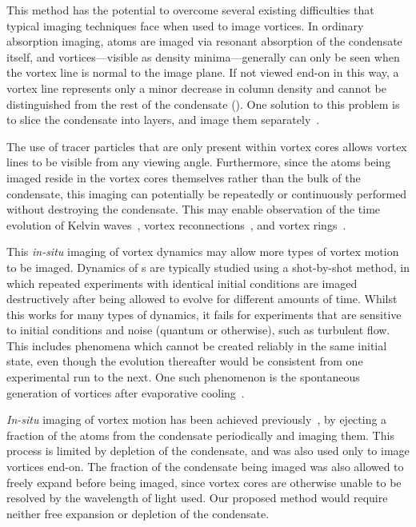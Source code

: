 This method has the potential to overcome several existing difficulties that typical imaging techniques face when used to image vortices. In ordinary absorption imaging, atoms are imaged via resonant absorption of the condensate itself, and vortices---visible as density minima---generally can only be seen when the vortex line is normal to the image plane. If not viewed end-on in this way, a vortex line represents only a minor decrease in column density and cannot be distinguished from the rest of the condensate (). One solution to this problem is to slice the condensate into layers, and image them separately~\cite{anderson_watching_2001}.

The use of tracer particles that are only present within vortex cores allows vortex lines to be visible from any viewing angle.  Furthermore, since the atoms being imaged reside in the vortex cores themselves rather than the bulk of the condensate, this imaging can potentially be repeatedly or continuously performed without destroying the condensate. This may enable observation of the time evolution of Kelvin waves~\cite{bretin_quadrupole_2003}, vortex reconnections~\cite{leadbeater_sound_2001}, and vortex rings~\cite{anderson_watching_2001}.

This \emph{in-situ} imaging of vortex dynamics may allow more types of vortex motion to be imaged. Dynamics of \bec s are typically studied using a shot-by-shot method, in which repeated experiments with identical initial conditions are imaged destructively after being allowed to evolve for different amounts of time. Whilst this works for many types of dynamics, it fails for experiments that are sensitive to initial conditions and noise (quantum or otherwise), such as turbulent flow. This includes phenomena which cannot be created reliably in the same initial state, even though the evolution thereafter would be consistent from one experimental run to the next. One such phenomenon is the spontaneous generation of vortices after evaporative cooling~\cite{weiler_spontaneous_2008}.

\emph{In-situ} imaging of vortex motion has been achieved previously~\cite{freilich_real-time_2010}, by ejecting a fraction of the atoms from the condensate periodically and imaging them. This process is limited by depletion of the condensate, and was also used only to image vortices end-on. The fraction of the condensate being imaged was also allowed to freely expand before being imaged, since vortex cores are otherwise unable to be resolved by the wavelength of light used. Our proposed method would require neither free expansion or depletion of the condensate.

